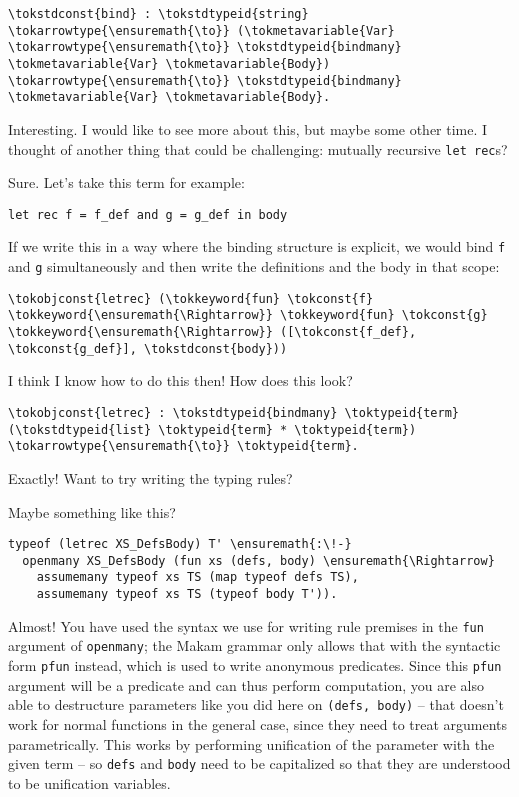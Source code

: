 \begin{verbatim}
\tokstdconst{bind} : \tokstdtypeid{string} \tokarrowtype{\ensuremath{\to}} (\tokmetavariable{Var} \tokarrowtype{\ensuremath{\to}} \tokstdtypeid{bindmany} \tokmetavariable{Var} \tokmetavariable{Body}) \tokarrowtype{\ensuremath{\to}} \tokstdtypeid{bindmany} \tokmetavariable{Var} \tokmetavariable{Body}.
\end{verbatim}

\heroSTUDENT{} Interesting. I would like to see more about this, but maybe
some other time. I thought of another thing that could be challenging:
mutually recursive \texttt{let\ rec}s?

\heroADVISOR{} Sure. Let's take this term for example:

\begin{verbatim}
let rec f = f_def and g = g_def in body
\end{verbatim}

\noindent
If we write this in a way where the binding structure is explicit, we
would bind \texttt{f} and \texttt{g} simultaneously and then write the
definitions and the body in that scope:

\begin{verbatim}
\tokobjconst{letrec} (\tokkeyword{fun} \tokconst{f} \tokkeyword{\ensuremath{\Rightarrow}} \tokkeyword{fun} \tokconst{g} \tokkeyword{\ensuremath{\Rightarrow}} ([\tokconst{f_def}, \tokconst{g_def}], \tokstdconst{body}))
\end{verbatim}

\heroSTUDENT{} I think I know how to do this then! How does this look?

\begin{verbatim}
\tokobjconst{letrec} : \tokstdtypeid{bindmany} \toktypeid{term} (\tokstdtypeid{list} \toktypeid{term} * \toktypeid{term}) \tokarrowtype{\ensuremath{\to}} \toktypeid{term}.
\end{verbatim}

\heroADVISOR{} Exactly! Want to try writing the typing rules?

\heroSTUDENT{} Maybe something like this?

\begin{verbatim}
typeof (letrec XS_DefsBody) T' \ensuremath{:\!-}
  openmany XS_DefsBody (fun xs (defs, body) \ensuremath{\Rightarrow}
    assumemany typeof xs TS (map typeof defs TS),
    assumemany typeof xs TS (typeof body T')).
\end{verbatim}

\heroADVISOR{} Almost! You have used the syntax we use for writing rule
premises in the \texttt{fun} argument of \texttt{openmany}; the Makam
grammar only allows that with the syntactic form \texttt{pfun} instead,
which is used to write anonymous predicates. Since this \texttt{pfun}
argument will be a predicate and can thus perform computation, you are
also able to destructure parameters like you did here on
\texttt{(defs,\ body)} -- that doesn't work for normal functions in the
general case, since they need to treat arguments parametrically. This
works by performing unification of the parameter with the given term --
so \texttt{defs} and \texttt{body} need to be capitalized so that they
are understood to be unification variables.

